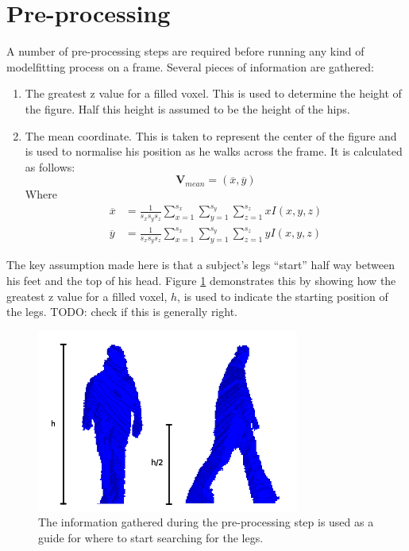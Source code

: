 \section{Pre-processing}\label{LocatingCenter}

A number of pre-processing steps are required before running any kind of modelfitting process on a frame.
Several pieces of information are gathered:

\begin{enumerate}
	\item The greatest z value for a filled voxel.
		This is used to determine the height of the figure.
		Half this height is assumed to be the height of the hips.
	\item The mean coordinate.
		This is taken to represent the center of the figure and is used to normalise his position as he walks across the frame.
		It is calculated as follows:
		\begin{equation}
			\mathbf{V}_{mean} = (\overline{x}, \overline{y})
		\end{equation}
		Where
		\begin{align}
			\overline{x} &= \frac{1}{s_x s_y s_z} \sum_{x=1}^{s_x} \sum_{y=1}^{s_y} \sum_{z=1}^{s_z} x I(x,y,z) \\
			\overline{y} &= \frac{1}{s_x s_y s_z} \sum_{x=1}^{s_x} \sum_{y=1}^{s_y} \sum_{z=1}^{s_z} y I(x,y,z)
		\end{align}
\end{enumerate}

The key assumption made here is that a subject's legs ``start'' half way between his feet and the top of his head.
Figure \ref{Preprocessing} demonstrates this by showing how the greatest z value for a filled voxel, $h$, is used to
indicate the starting position of the legs.
TODO: check if this is generally right.

\begin{figure}[b]
	\centering
	\includegraphics[height=6cm]{preprocessing.png}
	\caption{The information gathered during the pre-processing step is used as a guide for where to start searching for the legs.}
	\label{Preprocessing}
\end{figure}
